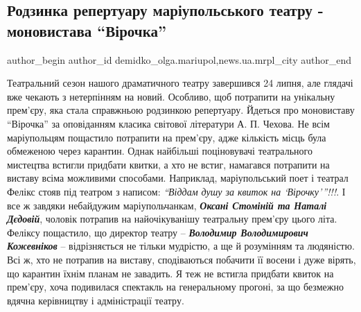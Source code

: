  
 
 
 
 
 
\subsection{Родзинка репертуару маріупольського театру - моновистава \enquote{Вірочка}}
\label{sec:27_07_2020.stz.news.ua.mrpl_city.1.rodzynka_mrpl_teatru_monovystava_virochka}
 
\ifcmt
 author_begin
   author_id demidko_olga.mariupol,news.ua.mrpl_city
 author_end
\fi


Театральний сезон нашого драматичного театру завершився 24 липня, але глядачі
вже чекають з нетерпінням на новий. Особливо, щоб потрапити на унікальну
прем'єру, яка стала справжньою родзинкою репертуару. Йдеться про моновиставу
\enquote{Вірочка} за оповіданням класика світової літератури А. П. Чехова. Не всім
маріупольцям пощастило потрапити на прем'єру, адже кількість місць була
обмеженою через карантин. Однак найбільші поціновувачі театрального мистецтва
встигли придбати квитки, а хто не встиг, намагався потрапити на виставу всіма
можливими способами. Наприклад, маріупольський поет і театрал Фелікс стояв під
театром з написом: \emph{\enquote{Віддам душу за квиток на \enquote{Вірочку}}!!!}. І все ж завдяки
небайдужим маріупольчанкам, \emph{\textbf{Оксані Стоміній та Наталі Дєдовій}}, чоловік потрапив
на найочікуванішу театральну прем'єру цього літа. Феліксу пощастило, що
директор театру – \emph{\textbf{Володимир Володимирович Кожевніков}} – відрізняється не тільки
мудрістю, а ще й розумінням та людяністю. Всі ж, хто не потрапив на виставу,
сподіваються побачити її восени і дуже вірять, що карантин їхнім планам не
завадить. Я теж не встигла придбати квиток на прем'єру, хоча подивилася
спектакль на генеральному прогоні, за що безмежно вдячна керівництву і
адміністрації театру.

